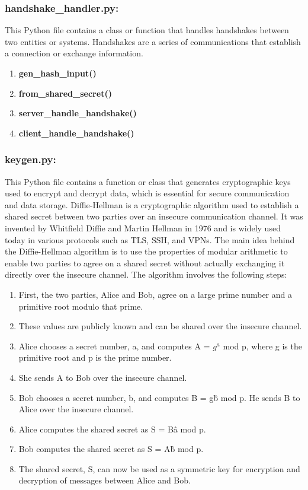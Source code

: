 \documentclass{article}
\begin{document}
\subsubsection{handshake\_handler.py:} This Python file contains a class or function that handles handshakes between two entities or systems.
Handshakes are a series of communications that establish a connection or exchange information.
\begin{enumerate}
    \item \textbf{gen\_hash\_input()}
    \item \textbf{from\_shared\_secret()}
    \item \textbf{server\_handle\_handshake()}
    \item \textbf{client\_handle\_handshake()}
\end{enumerate}

\subsubsection{keygen.py:} This Python file contains a function or class that generates cryptographic keys used to encrypt and decrypt data, which is essential for secure communication and data storage.
Diffie-Hellman is a cryptographic algorithm used to establish a shared secret between two parties over an insecure communication channel.
It was invented by Whitfield Diffie and Martin Hellman in 1976 and is widely used today in various protocols such as TLS, SSH, and VPNs.
The main idea behind the Diffie-Hellman algorithm is to use the properties of modular arithmetic to enable two parties to agree on a shared secret without actually exchanging it directly over the insecure channel.
The algorithm involves the following steps:
\begin{center}
\begin{enumerate}
    \item First, the two parties, Alice and Bob, agree on a large prime number and a primitive root modulo that prime.
    \item These values are publicly known and can be shared over the insecure channel.
    \item Alice chooses a secret number, a, and computes A = $g^a$ mod p, where g is the primitive root and p is the prime number.
    \item She sends A to Bob over the insecure channel.
    \item Bob chooses a secret number, b, and computes B = g\^b mod p. He sends B to Alice over the insecure channel.
    \item Alice computes the shared secret as S = B\^a mod p.
    \item Bob computes the shared secret as S = A\^b mod p.
    \item The shared secret, S, can now be used as a symmetric key for encryption and decryption of messages between Alice and Bob.
\end{enumerate}

\end{center}
\end{document}
